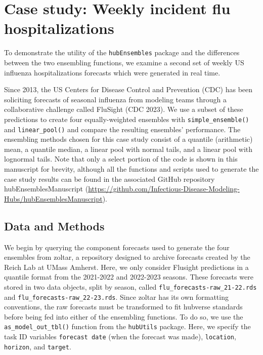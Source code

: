 \documentclass[
]{article}
\begin{document}
\section{Case study: Weekly incident flu
hospitalizations}\label{sec-flu}

To demonstrate the utility of the \texttt{hubEnsembles} package and the
differences between the two ensembling functions, we examine a second
set of weekly US influenza hospitalizations forecasts which were
generated in real time.

Since 2013, the US Centers for Disease Control and Prevention (CDC) has
been soliciting forecasts of seasonal influenza from modeling teams
through a collaborative challenge called FluSight (CDC 2023). We use a
subset of these predictions to create four equally-weighted ensembles
with \texttt{simple\_ensemble()} and \texttt{linear\_pool()} and compare
the resulting ensembles' performance. The ensembling methods chosen for
this case study consist of a quantile (arithmetic) mean, a quantile
median, a linear pool with normal tails, and a linear pool with
lognormal tails. Note that only a select portion of the code is shown in
this manuscript for brevity, although all the functions and scripts used
to generate the case study results can be found in the associated GitHub
repository hubEnsemblesManuscript
(\url{https://github.com/Infectious-Disease-Modeling-Hubs/hubEnsemblesManuscript}).

\subsection{Data and Methods}\label{data-and-methods}

We begin by querying the component forecasts used to generate the four
ensembles from zoltar, a repository designed to archive forecasts
created by the Reich Lab at UMass Amherst. Here, we only consider
Flusight predictions in a quantile format from the 2021-2022 and
2022-2023 seasons. These forecasts were stored in two data objects,
split by season, called \texttt{flu\_forecasts-raw\_21-22.rds} and
\texttt{flu\_forecasts-raw\_22-23.rds}. Since zoltar has its own
formatting conventions, the raw forecasts must be transformed to fit
hubverse standards before being fed into either of the ensembling
functions. To do so, we use the \texttt{as\_model\_out\_tbl()} function
from the \texttt{hubUtils} package. Here, we specify the task ID
variables \texttt{forecast\ date} (when the forecast was made),
\texttt{location}, \texttt{horizon}, and \texttt{target}.
\end{document}

